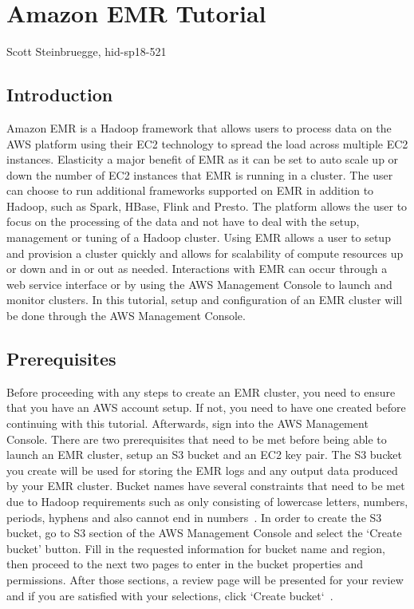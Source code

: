
\chapter{Amazon EMR Tutorial}

Scott Steinbruegge, hid-sp18-521

\section{Introduction}

Amazon EMR is a Hadoop framework that allows users to process data on the AWS 
platform using their EC2 technology to spread the load across multiple EC2 
instances. Elasticity a major benefit of EMR as it can be set to auto scale 
up or down the number of EC2 instances that EMR is running in a cluster. The 
user can choose to run additional frameworks supported on EMR in addition 
to Hadoop, such as Spark, HBase, Flink and Presto. The platform allows the 
user to focus on the processing of the data and not have to deal with the 
setup, management or tuning of a Hadoop cluster. Using EMR allows a user 
to setup and provision a cluster quickly and allows for scalability of 
compute resources up or down and in or out as needed. Interactions with 
EMR can occur through a web service interface or by using the AWS 
Management Console to launch and monitor clusters. In this tutorial, 
setup and configuration of an EMR cluster will be done through the AWS 
Management Console. 

\section{Prerequisites}

Before proceeding with any steps to create an EMR cluster, you need to 
ensure that you have an AWS account setup. If not, you need to have one 
created before continuing with this tutorial. Afterwards, sign into the 
AWS Management Console. There are two prerequisites that need to be met 
before being able to launch an EMR cluster, setup an S3 bucket and an EC2 
key pair. The S3 bucket you create will be used for storing the EMR logs 
and any output data produced by your EMR cluster. Bucket names have several 
constraints that need to be met due to Hadoop requirements such as only 
consisting of lowercase letters, numbers, periods, hyphens and also cannot 
end in numbers~\cite{hid-sp18-521-prereq}. In order to create the S3 bucket, 
go to S3 section of the AWS Management Console and select the `Create bucket' 
button. Fill in the requested information for bucket name and region, then 
proceed to the next two pages to enter in the bucket properties and 
permissions. After those sections, a review page will be presented for your 
review and if you are satisfied with your selections, 
click `Create bucket`~\cite{hid-sp18-521-s3bucket}. 

